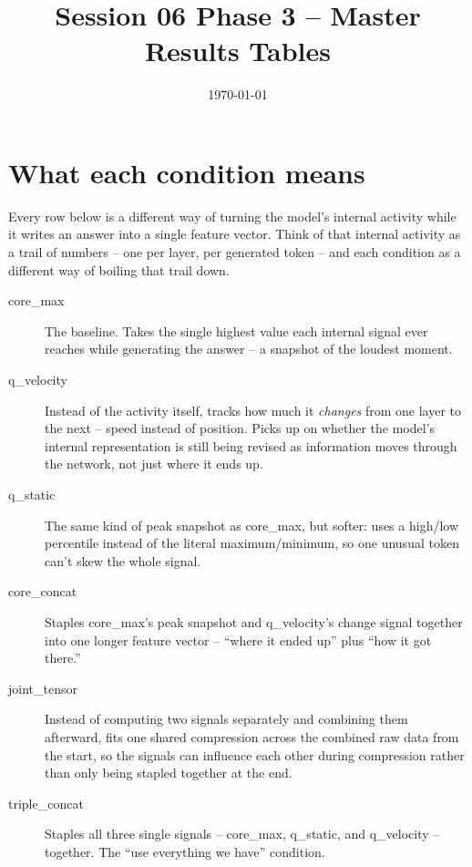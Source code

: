 \documentclass[11pt,a4paper]{article}
\title{Session 06 Phase 3 -- Master Results Tables}
\author{}
\date{\today}
\begin{document}
\maketitle

\section*{What each condition means}

Every row below is a different way of turning the model's internal activity while it writes
an answer into a single feature vector. Think of that internal activity as a trail of
numbers -- one per layer, per generated token -- and each condition as a different way of
boiling that trail down.

\begin{description}
\item[core\_max] The baseline. Takes the single highest value each internal signal ever
  reaches while generating the answer -- a snapshot of the loudest moment.
\item[q\_velocity] Instead of the activity itself, tracks how much it \emph{changes} from
  one layer to the next -- speed instead of position. Picks up on whether the model's
  internal representation is still being revised as information moves through the network,
  not just where it ends up.
\item[q\_static] The same kind of peak snapshot as core\_max, but softer: uses a high/low
  percentile instead of the literal maximum/minimum, so one unusual token can't skew the
  whole signal.
\item[core\_concat] Staples core\_max's peak snapshot and q\_velocity's change signal
  together into one longer feature vector -- ``where it ended up'' plus ``how it got
  there.''
\item[joint\_tensor] Instead of computing two signals separately and combining them
  afterward, fits one shared compression across the combined raw data from the start, so
  the signals can influence each other during compression rather than only being stapled
  together at the end.
\item[triple\_concat] Staples all three single signals -- core\_max, q\_static, and
  q\_velocity -- together. The ``use everything we have'' condition.
\end{description}
\end{document}

